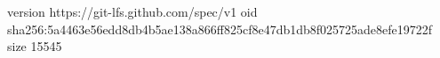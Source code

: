 version https://git-lfs.github.com/spec/v1
oid sha256:5a4463e56edd8db4b5ae138a866ff825cf8e47db1db8f025725ade8efe19722f
size 15545
